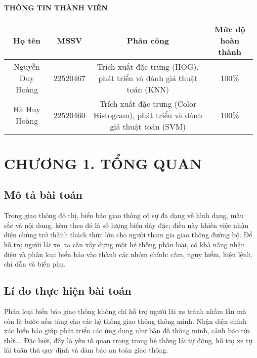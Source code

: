 \documentclass[a4paper,12pt]{article}
\begin{document}
\newpage
\thispagestyle{empty}
\begin{center}
    \textbf{\large THÔNG TIN THÀNH VIÊN}  %
\end{center}

\begin{center}
\begin{tabular}{|c|c|c|c|}
\hline
\textbf{Họ tên} & \textbf{MSSV} & \textbf{Phân công} & \textbf{Mức độ hoàn thành} \\
\hline
Nguyễn Duy Hoàng & 22520467 & \parbox{5cm}{\centering Trích xuất đặc trưng (HOG), phát triển và đánh giá thuật toán (KNN)} & 100\% \\
\hline
Hà Huy Hoàng & 22520460 & \parbox{5cm}{\centering Trích xuất đặc trưng (Color Histogram), phát triển và đánh giá thuật toán (SVM)} & 100\% \\
\hline
\end{tabular}
\end{center}

\newpage
\setcounter{page}{1}
\pagestyle{plain}
\section*{\centering CHƯƠNG 1. TỔNG QUAN}
\vspace{1cm}
\setcounter{section}{1}
\subsection{Mô tả bài toán}
\hspace{5mm}Trong giao thông đô thị, biển báo giao thông có sự đa dạng về hình dạng, màu sắc và nội dung, kèm theo đó là số lượng biển dày đặc; điều này khiến việc nhận diện chúng trở thành thách thức lớn cho người tham gia giao thông đường bộ. Để hỗ trợ người lái xe, ta cần xây dựng một hệ thống phân loại, có khả năng nhận diện và phân loại biển báo vào thành các nhóm chính: cấm, nguy hiểm, hiệu lệnh, chỉ dẫn và biển phụ.

\subsection{Lí do thực hiện bài toán}
\hspace{5mm}Phân loại biển báo giao thông không chỉ hỗ trợ người lái xe tránh nhầm lẫn mà còn là bước nền tảng cho các hệ thống giao thông thông minh. Nhận diện chính xác biển báo giúp phát triển các ứng dụng như bản đồ thông minh, cảnh báo tức thời... Đặc biệt, đây là yếu tố quan trọng trong hệ thống lái tự động, hỗ trợ xe tự lái tuân thủ quy định và đảm bảo an toàn giao thông.
\end{document}

